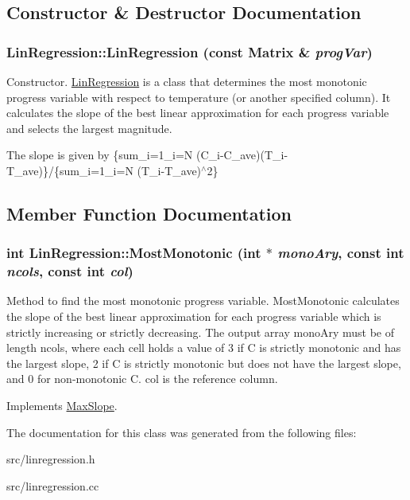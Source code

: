 \subsection{Constructor \& Destructor Documentation}
\hypertarget{classLinRegression_a0d747e38f7a8997765be15f43062290c}{
\subsubsection[{LinRegression}]{\setlength{\rightskip}{0pt plus 5cm}LinRegression::LinRegression (const {\bf Matrix} \& {\em progVar})}}
\label{de/d89/classLinRegression_a0d747e38f7a8997765be15f43062290c}


Constructor. \hyperlink{classLinRegression}{LinRegression} is a class that determines the most monotonic progress variable with respect to temperature (or another specified column). It calculates the slope of the best linear approximation for each progress variable and selects the largest magnitude.

The slope is given by \{sum\_\-i=1\_\-i=N (C\_\-i-\/C\_\-ave)(T\_\-i-\/T\_\-ave)\}/\{sum\_\-i=1\_\-i=N (T\_\-i-\/T\_\-ave)$^\wedge$2\} 

\subsection{Member Function Documentation}
\hypertarget{classLinRegression_a1f245c4e47637f3f1d94f6129861406d}{
\subsubsection[{MostMonotonic}]{\setlength{\rightskip}{0pt plus 5cm}int LinRegression::MostMonotonic (int $\ast$ {\em monoAry}, \/  const int {\em ncols}, \/  const int {\em col})}}
\label{de/d89/classLinRegression_a1f245c4e47637f3f1d94f6129861406d}


Method to find the most monotonic progress variable. MostMonotonic calculates the slope of the best linear approximation for each progress variable which is strictly increasing or strictly decreasing. The output array monoAry must be of length ncols, where each cell holds a value of 3 if C is strictly monotonic and has the largest slope, 2 if C is strictly monotonic but does not have the largest slope, and 0 for non-\/monotonic C. col is the reference column. 

Implements \hyperlink{classMaxSlope}{MaxSlope}.

The documentation for this class was generated from the following files:\begin{DoxyCompactItemize}
\item 
src/linregression.h\item 
src/linregression.cc\end{DoxyCompactItemize}
